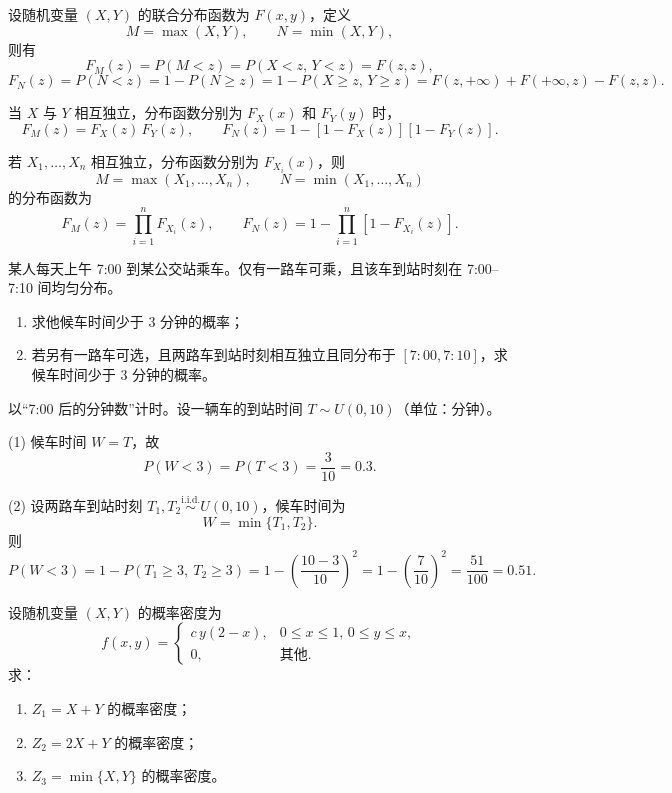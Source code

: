 \begin{definition}[极值的分布]
设随机变量 $(X,Y)$ 的联合分布函数为 $F(x,y)$，定义
\[
M=\max(X,Y), \qquad N=\min(X,Y),
\]
则有
\[
F_M(z)=P(M<z)=P(X<z,\,Y<z)=F(z,z),
\]
\[
F_N(z)=P(N<z)=1-P(N\ge z)
=1-P(X\ge z,\,Y\ge z)
=F(z,+\infty)+F(+\infty,z)-F(z,z).
\]

当 $X$ 与 $Y$ 相互独立，分布函数分别为 $F_X(x)$ 和 $F_Y(y)$ 时，
\[
F_M(z)=F_X(z)\,F_Y(z),
\qquad
F_N(z)=1-[1-F_X(z)][1-F_Y(z)].
\]

若 $X_1,\ldots,X_n$ 相互独立，分布函数分别为 $F_{X_i}(x)$，则
\[
M=\max(X_1,\ldots,X_n), \qquad N=\min(X_1,\ldots,X_n)
\]
的分布函数为
\[
F_M(z)=\prod_{i=1}^n F_{X_i}(z), \qquad
F_N(z)=1-\prod_{i=1}^n [1-F_{X_i}(z)].
\]
\end{definition}
\begin{example}[候车时间的概率]
某人每天上午 7:00 到某公交站乘车。仅有一路车可乘，且该车到站时刻在 7:00–7:10 间均匀分布。
\begin{enumerate}[(1)]
  \item 求他候车时间少于 3 分钟的概率；
  \item 若另有一路车可选，且两路车到站时刻相互独立且同分布于 $[7{:}00,7{:}10]$，求候车时间少于 3 分钟的概率。
\end{enumerate}
\end{example}

\begin{solution}
以“7:00 后的分钟数”计时。设一辆车的到站时间 $T\sim U(0,10)$（单位：分钟）。

\noindent(1) 候车时间 $W=T$，故
\[
P(W<3)=P(T<3)=\frac{3}{10}=0.3.
\]

\noindent(2) 设两路车到站时刻 $T_1,T_2\stackrel{\text{i.i.d.}}{\sim}U(0,10)$，候车时间为
\[
W=\min\{T_1,T_2\}.
\]
则
\[
P(W<3)=1-P(T_1\ge3,\ T_2\ge3)
=1-\left(\frac{10-3}{10}\right)^2
=1-\left(\frac{7}{10}\right)^2=\frac{51}{100}=0.51.
\]
\end{solution}
\begin{example}
设随机变量 $(X,Y)$ 的概率密度为
\[
f(x,y)=
\begin{cases}
c\,y(2-x), & 0\le x\le1,\,0\le y\le x,\\[4pt]
0, & \text{其他}.
\end{cases}
\]
求：
\begin{enumerate}[(1)]
  \item $Z_1=X+Y$ 的概率密度；
  \item $Z_2=2X+Y$ 的概率密度；
  \item $Z_3=\min\{X,Y\}$ 的概率密度。
\end{enumerate}
\end{example}

